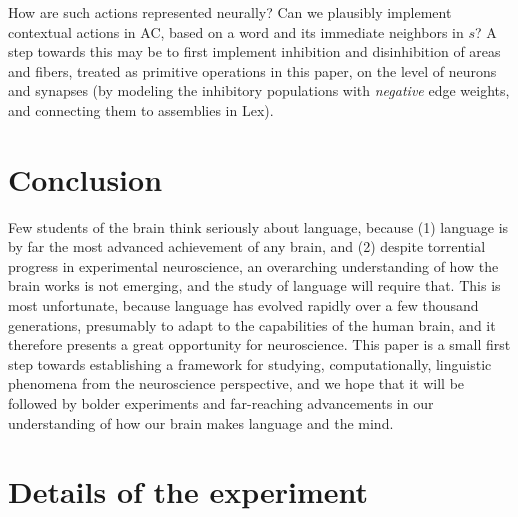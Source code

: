 \documentclass[11pt,a4paper]{article}
\begin{document}
How are such actions represented neurally? Can we plausibly implement contextual actions in AC, based on a word and its immediate neighbors in $s$? A step towards this may be to first implement inhibition and disinhibition of areas and fibers, treated as primitive operations in this paper, on the level of neurons and synapses (by modeling the inhibitory populations with {\em negative} edge weights, and connecting them to assemblies in {\sc Lex}).

\section{Conclusion}
Few students of the brain think seriously about language, because (1) language is by far the most advanced achievement of any brain, and (2) despite torrential progress in experimental neuroscience, an overarching understanding of how the brain works is not emerging, and the study of language will require that.  This is most unfortunate, because language has evolved rapidly over a few thousand generations, presumably to adapt to the capabilities of the human brain, and it therefore presents a great opportunity for neuroscience.  This paper is a small first step towards establishing a framework for studying, computationally, linguistic phenomena from the neuroscience perspective, and we hope that it will be followed by bolder experiments and far-reaching advancements in our understanding of how our brain makes language and the mind.

\section{Details of the experiment} \label{appendix}
\end{document}
